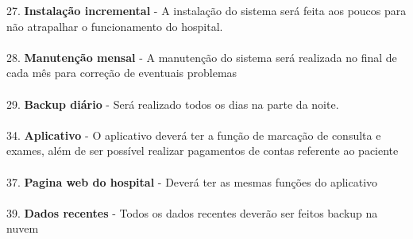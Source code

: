 27. \textbf{Instalação incremental} - A instalação do sistema será feita aos poucos para não atrapalhar o funcionamento do hospital.\\\\
28. \textbf{Manutenção mensal} - A manutenção do sistema será realizada no final de cada mês para correção de eventuais problemas\\\\
29. \textbf{Backup diário} - Será realizado todos os dias na parte da noite.\\\\
34. \textbf{Aplicativo} - O aplicativo deverá ter a função de marcação de consulta e exames, além de ser possível realizar pagamentos de contas referente ao paciente\\\\
37. \textbf{Pagina web do hospital} - Deverá ter as mesmas funções do aplicativo\\\\
39. \textbf{Dados recentes} - Todos os dados recentes deverão ser feitos backup na nuvem\\


